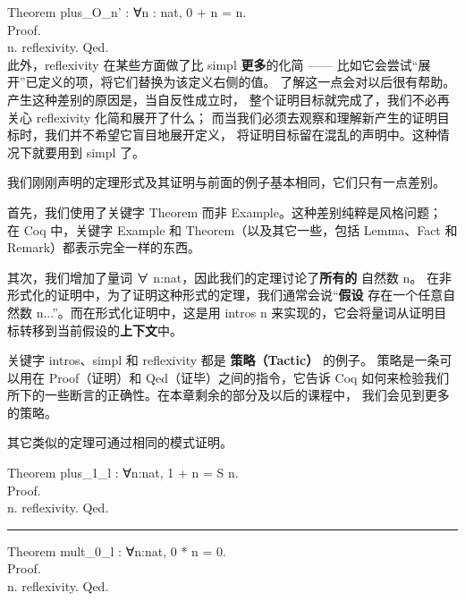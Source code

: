 \documentclass[utf8]{ctexart}
\begin{document}
{Theorem} {plus\_O\_n'} : {∀}{n} : {nat}, 0 + {n} = {n}.\\
{Proof}.\\
\hspace*{0.333em}\hspace*{0.333em}{intros} {n}. {reflexivity}. {Qed}.\\

此外，{{reflexivity}} 在某些方面做了比 {{simpl}} \textbf{更多}的化简
------ 比如它会尝试``展开''已定义的项，将它们替换为该定义右侧的值。
了解这一点会对以后很有帮助。产生这种差别的原因是，当自反性成立时，
整个证明目标就完成了，我们不必再关心 {{reflexivity}} 化简和展开了什么；
而当我们必须去观察和理解新产生的证明目标时，我们并不希望它盲目地展开定义，
将证明目标留在混乱的声明中。这种情况下就要用到 {{simpl}} 了。

我们刚刚声明的定理形式及其证明与前面的例子基本相同，它们只有一点差别。

首先，我们使用了关键字 {{Theorem}} 而非
{{Example}}。这种差别纯粹是风格问题； 在 Coq 中，关键字 {{Example}} 和
{{Theorem}}（以及其它一些，包括 {{Lemma}}、{{Fact}} 和
{{Remark}}）都表示完全一样的东西。

其次，我们增加了量词 {{∀}}
{{n}:{nat}}，因此我们的定理讨论了\textbf{所有的} 自然数 {{n}}。
在非形式化的证明中，为了证明这种形式的定理，我们通常会说``\textbf{假设}
存在一个任意自然数 {{n}}...''。而在形式化证明中，这是用 {{intros}} {{n}}
来实现的，它会将量词从证明目标转移到当前假设的\textbf{上下文}中。

关键字 {{intros}}、{{simpl}} 和 {{reflexivity}} 都是
\textbf{策略（Tactic）} 的例子。 策略是一条可以用在 {{Proof}}（证明）和
{{Qed}}（证毕）之间的指令，它告诉 Coq
如何来检验我们所下的一些断言的正确性。在本章剩余的部分及以后的课程中，
我们会见到更多的策略。

其它类似的定理可通过相同的模式证明。

{Theorem} {plus\_1\_l} : {∀}{n}:{nat}, 1 + {n} = {S} {n}.\\
{Proof}.\\
\hspace*{0.333em}\hspace*{0.333em}{intros} {n}. {reflexivity}. {Qed}.\\

\begin{center}\rule{0.5\linewidth}{\linethickness}\end{center}

{Theorem} {mult\_0\_l} : {∀}{n}:{nat}, 0 * {n} = 0.\\
{Proof}.\\
\hspace*{0.333em}\hspace*{0.333em}{intros} {n}. {reflexivity}. {Qed}.\\
\end{document}
